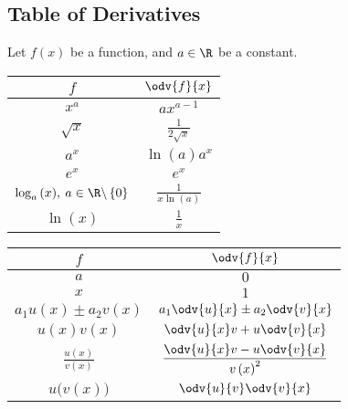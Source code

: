 \documentclass{article}
\begin{document}
\subsection{Table of Derivatives}
Let \(f\left( x \right)\) be a function, and \(a\in\R\) be a constant.
\begin{table}[H]
    \renewcommand*{\arraystretch}{1.5}
    \centering
    \begin{tabular}{c c}
        \toprule
        \(f\)                                                              & \(\odv{f}{x}\)                                   \\
        \midrule
        \(x^a\)                                                            & \(a x^{a-1}\)                                    \\
        \(\sqrt{x}\)                                                       & \(\displaystyle \frac{1}{2\sqrt{x}}\)            \\
        \(a^x\)                                                            & \(\ln{\left(a\right)} a^x\)                      \\
        \(e^x\)                                                            & \(e^x\)                                          \\
        \(\log_a{\left(x\right)}, \: a\in \R\backslash\left\{ 0 \right\}\) & \(\displaystyle \frac{1}{x\ln{\left(a\right)}}\) \\[8pt]
        \(\ln{\left(x\right)}\)                                            & \(\displaystyle \frac{1}{x}\)                    \\[5pt]
        \bottomrule
    \end{tabular}
    \begin{tabular}{c c}
        \toprule
        \(f\)                                                         & \(\odv{f}{x}\)                                                            \\
        \midrule
        \(a\)                                                         & \(0\)                                                                     \\
        \(x\)                                                         & \(1\)                                                                     \\
        \(a_1 u\left( x \right) \pm a_2 v\left( x \right)\)           & \(\displaystyle a_1\odv{u}{x} \pm a_2\odv{v}{x}\)                         \\[8pt]
        \(u\left( x \right)v\left( x \right)\)                        & \(\displaystyle \odv{u}{x}v + u\odv{v}{x}\)                               \\[10pt]
        \(\displaystyle \frac{u\left( x \right)}{v\left( x \right)}\) & \(\displaystyle \frac{\odv{u}{x}v - u\odv{v}{x}}{{v\left( x \right)}^2}\) \\[8pt]
        \(u\bigl(v\left(x \right) \bigr)\)                            & \(\displaystyle \odv{u}{v}\odv{v}{x}\)                                    \\[5pt]
        \bottomrule
    \end{tabular}
\end{table}
\end{document}
